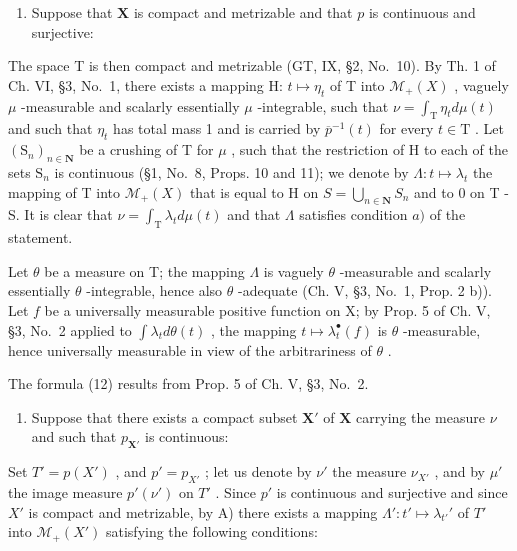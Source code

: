 \begin{enumerate}
\def\labelenumi{\Alph{enumi})}
\tightlist
\item
  Suppose that \(\mathbf{X}\) is compact and metrizable and that \(p\) is continuous and surjective:
\end{enumerate}

The space T is then compact and metrizable (GT, IX, §2, No.~10). By Th. 1 of Ch. VI, §3, No.~1, there exists a mapping H: \(t \mapsto \eta_t\) of T into \(\mathcal{M}_+(X)\) , vaguely \(\mu\) -measurable and scalarly essentially \(\mu\) -integrable, such that \(\nu = \int_{\mathrm{T}} \eta_t d\mu(t)\) and such that \(\eta_t\) has total mass 1 and is carried by \(\overline{p}^{-1}(t)\) for every \(t \in \mathrm{T}\) . Let \((\mathrm{S}_n)_{n \in \mathbf{N}}\) be a crushing of T for \(\mu\) , such that the restriction of H to each of the sets \(\mathrm{S}_n\) is continuous (§1, No.~8, Props. 10 and 11); we denote by \(\Lambda: t \mapsto \lambda_t\) the mapping of T into \(\mathcal{M}_+(X)\) that is equal to H on \(S = \bigcup_{n \in \mathbf{N}} S_n\) and to 0 on T - S. It is clear that \(\nu = \int_{\mathrm{T}}\lambda_t d\mu (t)\) and that \(\Lambda\) satisfies condition \(a)\) of the statement.

Let \(\theta\) be a measure on T; the mapping \(\Lambda\) is vaguely \(\theta\) -measurable and scalarly essentially \(\theta\) -integrable, hence also \(\theta\) -adequate (Ch. V, §3, No.~1, Prop. 2 b)). Let \(f\) be a universally measurable positive function on X; by Prop. 5 of Ch. V, §3, No.~2 applied to \(\int \lambda_t d\theta(t)\) , the mapping \(t \mapsto \lambda_t^{\bullet}(f)\) is \(\theta\) -measurable, hence universally measurable in view of the arbitrariness of \(\theta\) .

The formula (12) results from Prop. 5 of Ch. V, §3, No.~2.

\begin{enumerate}
\def\labelenumi{\Alph{enumi})}
\setcounter{enumi}{1}
\tightlist
\item
  Suppose that there exists a compact subset \(\mathbf{X}'\) of \(\mathbf{X}\) carrying the measure \(\nu\) and such that \(p_{\mathbf{X}'}\) is continuous:
\end{enumerate}

Set \(T' = p(X')\) , and \(p' = p_{X'}\) ; let us denote by \(\nu'\) the measure \(\nu_{X'}\) , and by \(\mu'\) the image measure \(p'(\nu')\) on \(T'\) . Since \(p'\) is continuous and surjective and since \(X'\) is compact and metrizable, by A) there exists a mapping \(\Lambda': t' \mapsto \lambda_{t'}'\) of \(T'\) into \(\mathcal{M}_{+}(X')\) satisfying the following conditions:

